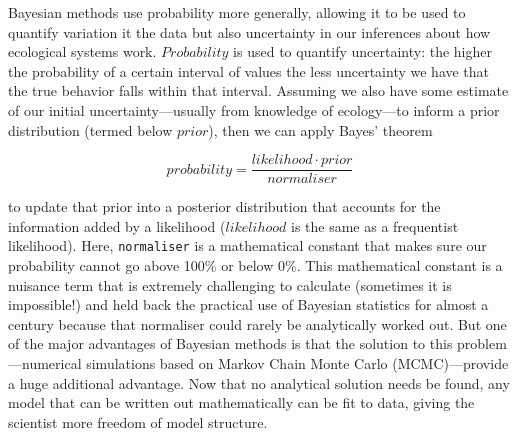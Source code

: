 \documentclass[11pt]{article}
\begin{document}
Bayesian methods use probability more generally, allowing it to be used to quantify variation it the data but also uncertainty in our inferences about how ecological systems work. $Probability$ is used to quantify uncertainty: the higher the probability of a certain interval of values the less uncertainty we have that the true behavior falls within that interval. Assuming we also have some estimate of our initial uncertainty---usually from knowledge of ecology---to inform a prior distribution (termed below $prior$), then we can apply Bayes' theorem

\begin{equation}
  probability = \frac{likelihood \cdot prior}{normaliser}
  \label{bayes_theorem}
\end{equation}

to update that prior into a posterior distribution that accounts for the information added by a likelihood ($likelihood$ is the same as a frequentist likelihood). Here, \texttt{normaliser} is a mathematical constant that makes sure our probability cannot go above 100\% or below 0\%. This mathematical constant is a nuisance term that is extremely challenging to calculate (sometimes it is impossible!) and held back the practical use of Bayesian statistics for almost a century because that normaliser could rarely be analytically worked out. But one of the major advantages of Bayesian methods is that the solution to this problem---numerical simulations based on Markov Chain Monte Carlo (MCMC)---provide a huge additional advantage. Now that no analytical solution needs be found, any model that can be written out mathematically can be fit to data, giving the scientist more freedom of model structure.

\end{document}
